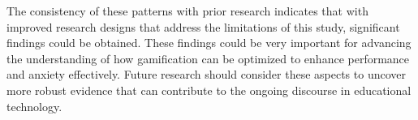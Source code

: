The consistency of these patterns with prior research indicates that with improved research designs that address the limitations of this study, significant findings could be obtained.
These findings could be very important for advancing the understanding of how gamification can be optimized to enhance performance and anxiety effectively.
Future research should consider these aspects to uncover more robust evidence that can contribute to the ongoing discourse in educational technology.
